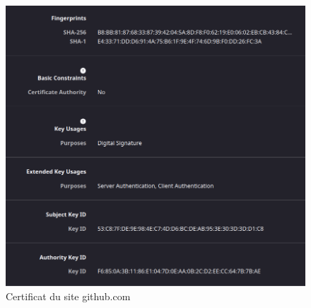 \documentclass[12pt,a4paper]{article}
\begin{document}
\begin{figure}[!h]
\begin{minipage}{0.3\textwidth}
    \end{minipage}
    \begin{minipage}{0.3\textwidth}
        \centering
        \includegraphics[scale=0.25]{github_2.png}
    \end{minipage}
    \caption{Certificat du site github.com}
\end{figure}
\end{document}
